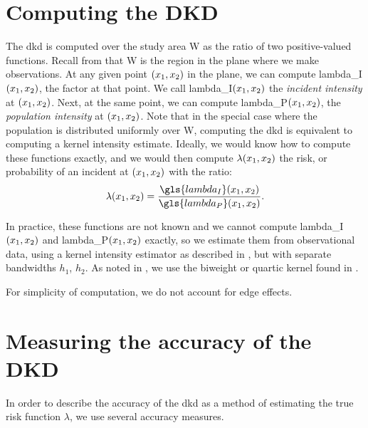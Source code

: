 \section{Computing the DKD}
\label{sec:method:computing}

The \gls{dkd} is computed over the study area \gls{W} as the ratio of two positive-valued functions.
Recall from  that \gls{W} is the region in the plane where we make observations.
At any given point $(x_1, x_2)$ in the plane, we can compute \gls{lambda_I}$(x_1, x_2)$, the \gls{factor} at that point.
We call \gls{lambda_I}$(x_1, x_2)$ the \textit{incident intensity} at $(x_1, x_2)$.
Next, at the same point, we can compute \gls{lambda_P}$(x_1, x_2)$,
the \textit{population intensity} at $(x_1, x_2)$.
Note that in the special case where the population is distributed uniformly over \gls{W},
computing the \gls{dkd} is equivalent to computing a kernel intensity estimate.
Ideally, we would know how to compute these functions exactly,
and we would then compute $\lambda(x_1, x_2)$ the risk,
or probability of an incident at $(x_1, x_2)$ with the ratio:
\begin{equation}
    \lambda\xvec = \frac{\gls{lambda_I}\xvec}{\gls{lambda_P}\xvec}.
\end{equation}

In practice, these functions are not known and we cannot compute \gls{lambda_I}$(x_1, x_2)$ and \gls{lambda_P}$(x_1, x_2)$ exactly, 
so we estimate them from observational data,
using a \gls{kernel intensity estimator} as described in ,
but with separate bandwidths $h_1$, $h_2$.
As noted in ,
we use the biweight or quartic kernel found in .

For simplicity of computation, we do not account for edge effects.


\section{Measuring the accuracy of the DKD}
\label{sec:method:accuracy}

In order to describe the accuracy of the \gls{dkd} as a method of estimating the true risk function $\lambda$,
we use several accuracy measures.

